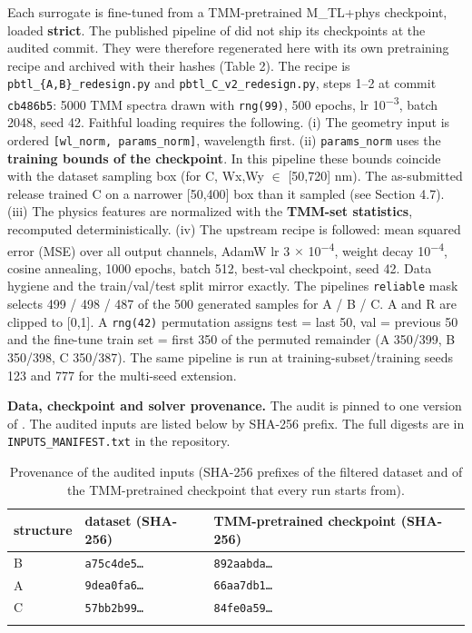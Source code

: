 \documentclass[11pt,a4paper]{article}
\begin{document}
Each surrogate is fine-tuned from a TMM-pretrained M\_TL+phys checkpoint, loaded
\textbf{strict}. The published pipeline of \cite{choi20261} did not ship its checkpoints at the audited commit. They were
therefore regenerated here with its own pretraining recipe and archived with their
hashes (Table 2). The recipe is \texttt{pbtl\_\allowbreak{}\{A,\allowbreak{}B\}\_\allowbreak{}redesign.\allowbreak{}py} and \texttt{pbtl\_\allowbreak{}C\_\allowbreak{}v2\_\allowbreak{}redesign.\allowbreak{}py},
steps 1--2 at commit \texttt{cb486b5}: 5000 TMM spectra drawn with \texttt{rng(99)}, 500 epochs,
lr 10\textsuperscript{\ensuremath{-}}\textsuperscript{3}, batch 2048, seed 42. Faithful loading requires the following.
(i) The geometry input is ordered \texttt{{[}wl\_norm,\ params\_norm{]}}, wavelength first.
(ii) \texttt{params\_norm} uses the \textbf{training bounds of the checkpoint}. In this pipeline
these bounds coincide with the dataset sampling box (for C, Wx,Wy \ensuremath{\in} {[}50,720{]} nm). The
as-submitted release trained C on a narrower {[}50,400{]} box than it sampled (see
Section 4.7). (iii) The physics features are normalized with the \textbf{TMM-set
statistics}, recomputed deterministically. (iv) The upstream recipe is followed: mean squared error (MSE) over all output channels, AdamW \cite{loshchilov201939} lr 3 \ensuremath{\times} 10\textsuperscript{\ensuremath{-}}\textsuperscript{4}, weight decay 10\textsuperscript{\ensuremath{-}}\textsuperscript{4}, cosine
annealing, 1000 epochs, batch 512, best-val checkpoint, seed 42. Data hygiene and
the train/val/test split mirror \cite{choi20261} exactly. The pipeline\textquotesingle s \texttt{reliable} mask selects
499 / 498 / 487 of the 500 generated samples for A / B / C. A and R are clipped to
{[}0,1{]}. A \texttt{rng(42)} permutation assigns test = last 50, val = previous 50 and the
fine-tune train set = first 350 of the permuted remainder (A 350/399, B 350/398,
C 350/387). The same pipeline is run at training-subset/training seeds 123 and 777
for the multi-seed extension.

\textbf{Data, checkpoint and solver provenance.} The audit is pinned to one version
of \cite{choi20261}. The audited inputs are listed below by SHA-256 prefix. The full digests are
in \texttt{INPUTS\_\allowbreak{}MANIFEST.\allowbreak{}txt} in the repository.

\begin{table}[htbp]
\centering
\caption{Provenance of the audited inputs (SHA-256 prefixes of the filtered dataset and of the TMM-pretrained checkpoint that every run starts from).}
\label{tab:2}
\begin{tabular}{@{}lll@{}}
\toprule\noalign{}
structure & dataset (SHA-256) & TMM-pretrained checkpoint (SHA-256) \\
\midrule\noalign{}
B & \texttt{a75c4de5\ldots{}} & \texttt{892aabda\ldots{}} \\
A & \texttt{9dea0fa6\ldots{}} & \texttt{66aa7db1\ldots{}} \\
C & \texttt{57bb2b99\ldots{}} & \texttt{84fe0a59\ldots{}} \\
\bottomrule\noalign{}
\end{tabular}
\end{table}
\end{document}
